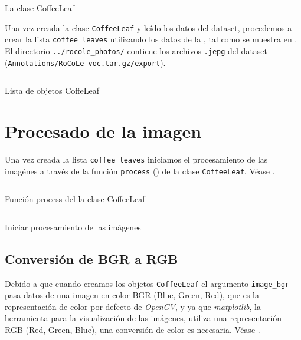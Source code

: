 \begin{listing}[!ht]
\inputminted{python}{code_listings/coffee_leaf.py}
\caption{La clase CoffeeLeaf}
\label{code:coffee_leaf}
\end{listing}

Una vez creada la clase \texttt{CoffeeLeaf} y leído los datos del dataset, procedemos a crear la lista \texttt{coffee\_leaves} utilizando los datos de la , tal como se muestra en . El directorio \texttt{../rocole\_photos/} contiene los archivos \texttt{.jepg} del dataset (\texttt{Annotations/RoCoLe-voc.tar.gz/export}).

\begin{listing}[!ht]
\inputminted{python}{code_listings/coffee_leaves.py}
\caption{Lista de objetos CoffeLeaf}
\label{code:coffee_leaves}
\end{listing}

\section{Procesado de la imagen}
Una vez creada la lista \texttt{coffee\_leaves} iniciamos el procesamiento de las imagénes a través de la función \texttt{process} () de la clase \texttt{CoffeeLeaf}. Véase .

\begin{listing}[!ht]
\inputminted{python}{code_listings/process.py}
\caption{Función process del la clase CoffeeLeaf}
\label{code:process}
\end{listing}

\begin{listing}[!ht]
\inputminted{python}{code_listings/process_iteration.py}
\caption{Iniciar procesamiento de las imágenes}
\label{code:process_iteration}
\end{listing}

\subsection{Conversión de BGR a RGB}
Debido a que cuando creamos los objetos \texttt{CoffeeLeaf} el argumento \texttt{image\_bgr} pasa datos de una imagen en color \textsf{BGR} (Blue, Green, Red), que es la representación de color por defecto de \textit{OpenCV}, y ya que \textit{matplotlib}, la herramienta para la visualización de las imágenes, utiliza una representación \textsf{RGB} (Red, Green, Blue), una conversión de color es necesaria. Véase .

